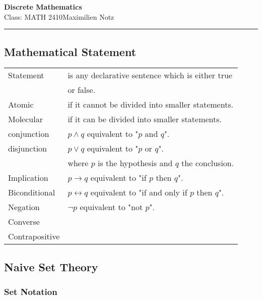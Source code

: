 \documentclass[5pt]{article}
\begin{document}
\begin{center}
     \Large{\textbf{Discrete Mathematics}}\\
     \small{Class: MATH 2410}\hfill\small{\textcopyright Maximilien Notz \the\year{}}
     \noindent\rule{20.2cm}{0.4pt}
\end{center}


\begin{multicols}{2}
\setcounter{secnumdepth}{0}


\subsection{Mathematical Statement}
\begin{tabular}{ll}
    Statement       & is any declarative sentence which is either true\\
                    & or false.\\
    Atomic          & if it cannot be divided into smaller statements.\\
    Molecular       & if it can be divided into smaller statements.\\
    conjunction     & $p\land q$ equivalent to "$p$ and $q$".\\
    disjunction     & $p\lor q$ equivalent to "$p$ or $q$".\\
                    & where $p$ is the hypothesis and $q$ the conclusion.\\
    Implication     & $p\rightarrow q$ equivalent to "if $p$ then $q$".\\
    Biconditional   & $p\leftrightarrow q$ equivalent to "if and only if $p$ then $q$".\\
    Negation        & $\lnot p$ equivalent to "not $p$".\\
    Converse        & \\
    Contrapositive  & \\
    
    
\end{tabular}

\subsection{Naive Set Theory}
\subsubsection{Set Notation}
\begin{tabular}{ll}








\end{tabular}
\end{multicols}
\end{document}
